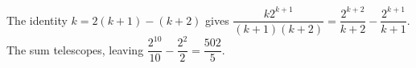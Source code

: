 The identity $k=2(k+1)-(k+2)$ gives $\dfrac{k2^{k+1}}{(k+1)(k+2)}=\dfrac{2^{k+2}}{k+2}-\dfrac{2^{k+1}}{k+1}$. The sum telescopes, leaving $\dfrac{2^{10}}{10}-\dfrac{2^2}{2}=\boxed{\dfrac{502}{5}}$.
